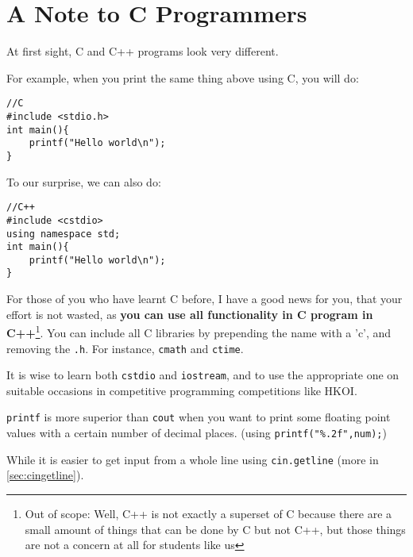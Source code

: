 \chapter{A Note to C Programmers}

At first sight, C and C++ programs look very different. 

For example, when you print the same thing above using C, you will do:

\begin{lstlisting}
//C
#include <stdio.h> 
int main(){
    printf("Hello world\n");
}
\end{lstlisting}

To our surprise, we can also do:

\begin{lstlisting}
//C++
#include <cstdio>
using namespace std;
int main(){
    printf("Hello world\n");
}
\end{lstlisting}

For those of you who have learnt C before, I have a good news for you, that your effort is not wasted, as \textbf{you can use all functionality in C program in C++}\footnote{Out of scope: Well, C++ is not exactly a superset of C because there are a small amount of things that can be done by C but not C++, but those things are not a concern at all for students like us}. You can include all C libraries by prepending the name with a 'c', and removing the \texttt{.h}. For instance, \texttt{cmath} and \texttt{ctime}.

It is wise to learn both \texttt{cstdio} and \texttt{iostream}, and to use the appropriate one on suitable occasions in competitive programming competitions like HKOI.

\texttt{printf} is more superior than \texttt{cout} when you want to print some floating point values with a certain number of decimal places. (using \texttt{printf("\%.2f",num);})

While it is easier to get input from a whole line using \texttt{cin.getline} (more in \cref{sec:cingetline}).
